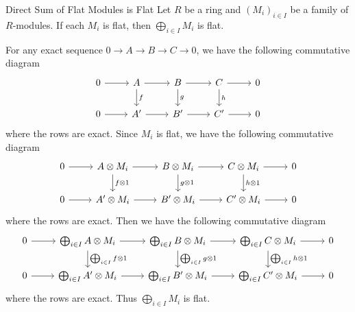 \begin{proposition}{Direct Sum of Flat Modules is Flat}{}
    Let $R$ be a ring and $\left(M_i\right)_{i\in I}$ be a family of $R$-modules. If each $M_i$ is flat, then $\bigoplus_{i\in I}M_i$ is flat.
\end{proposition}
\begin{prf}
    For any exact sequence $0\to A\to B\to C\to 0$, we have the following commutative diagram
    \[
        \begin{tikzcd}
            0 \arrow[r] & A \arrow[r] \arrow[d, "f"] & B \arrow[r] \arrow[d, "g"] & C \arrow[r] \arrow[d, "h"] & 0 \\
            0 \arrow[r] & A' \arrow[r] & B' \arrow[r] & C' \arrow[r] & 0
        \end{tikzcd}
    \]
    where the rows are exact. Since $M_i$ is flat, we have the following commutative diagram
    \[
        \begin{tikzcd}
            0 \arrow[r] & A\otimes M_i \arrow[r] \arrow[d, "f\otimes 1"] & B\otimes M_i \arrow[r] \arrow[d, "g\otimes 1"] & C\otimes M_i \arrow[r] \arrow[d, "h\otimes 1"] & 0 \\
            0 \arrow[r] & A'\otimes M_i \arrow[r] & B'\otimes M_i \arrow[r] & C'\otimes M_i \arrow[r] & 0
        \end{tikzcd}
    \]
    where the rows are exact. Then we have the following commutative diagram
    \[
        \begin{tikzcd}
            0 \arrow[r] & \bigoplus_{i\in I}A\otimes M_i \arrow[r] \arrow[d, "\bigoplus_{i\in I}f\otimes 1"] & \bigoplus_{i\in I}B\otimes M_i \arrow[r] \arrow[d, "\bigoplus_{i\in I}g\otimes 1"] & \bigoplus_{i\in I}C\otimes M_i \arrow[r] \arrow[d, "\bigoplus_{i\in I}h\otimes 1"] & 0 \\
            0 \arrow[r] & \bigoplus_{i\in I}A'\otimes M_i \arrow[r] & \bigoplus_{i\in I}B'\otimes M_i \arrow[r] & \bigoplus_{i\in I}C'\otimes M_i \arrow[r] & 0
        \end{tikzcd}
    \]
    where the rows are exact. Thus $\bigoplus_{i\in I}M_i$ is flat.
    
\end{prf}

